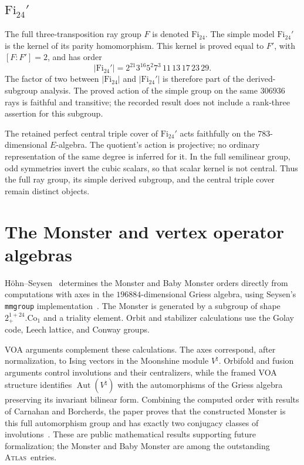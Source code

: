 \documentclass[11pt]{article}
\numberwithin{equation}{section}
\theoremstyle{definition}
\newcommand{\Fi}{\mathrm{Fi}}
\newcommand{\atlas}{\textsc{Atlas}}
\newcommand{\code}[1]{\texttt{\small #1}}
\begin{document}
\subsection{\texorpdfstring{$\Fi_{24}'$}{Fi24 prime}}

The full three-transposition ray group $F$ is denoted $\Fi_{24}$.
The simple model $\Fi_{24}'$ is the kernel of its parity
homomorphism. This kernel is proved equal to $F'$, with $[F:F']=2$,
and has order
\[
 |\Fi_{24}'|=2^{21}3^{16}5^2 7^3\,11\,13\,17\,23\,29.
\]
The factor of two between $|\Fi_{24}|$ and $|\Fi_{24}'|$ is therefore
part of the derived-subgroup analysis. The proved action of the
simple group on the same $306936$ rays is faithful and transitive;
the recorded result does not include a rank-three assertion for
this subgroup.

The retained perfect central triple cover of $\Fi_{24}'$ acts
faithfully on the $783$-dimensional $E$-algebra. The quotient's
action is projective; no ordinary representation of the same degree
is inferred for it. In the full semilinear group, odd symmetries
invert the cubic scalars, so that scalar kernel is not central.
Thus the full ray group, its simple derived subgroup, and the
central triple cover remain distinct objects.

\section{The Monster and vertex operator algebras}\label{sec:monster}

H\"ohn--Seysen~\cite{MonsterOrder} determines the Monster and Baby
Monster orders directly from computations with axes in the
$196884$-dimensional Griess algebra, using Seysen's
\code{mmgroup} implementation~\cite{SeysenImplementation}. The Monster
is generated by a subgroup of shape $2^{1+24}_{+}.\mathrm{Co}_1$ and a
triality element. Orbit and stabilizer calculations use the Golay code,
Leech lattice, and Conway groups.

VOA arguments complement these calculations. The axes correspond, after
normalization, to Ising vectors in the Moonshine module $V^{\natural}$.
Orbifold and fusion arguments control involutions and their
centralizers, while the framed VOA structure identifies
$\operatorname{Aut}(V^{\natural})$ with the automorphisms of the Griess
algebra preserving its invariant bilinear form. Combining the computed
order with results of Carnahan and Borcherds, the paper proves that the
constructed Monster is this full automorphism group and has exactly two
conjugacy classes of involutions~\cite[Sections~2 and~5]{MonsterOrder}.
These are public mathematical results supporting future formalization;
the Monster and Baby Monster are among the outstanding \atlas\ entries.
\end{document}
